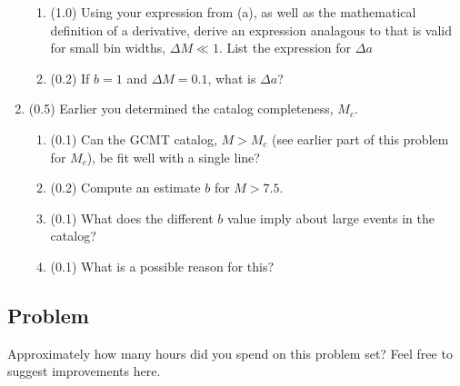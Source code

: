 \documentclass[11pt,titlepage,fleqn]{article}
\begin{document}
\begin{enumerate}
\begin{enumerate}

\item (1.0) Using your expression from (a), as well as the mathematical definition of a derivative, derive an expression analagous to  that is valid for small bin widths, $\Delta M \ll 1$. List the expression for $\Delta a$

\item (0.2) If $b = 1$ and $\Delta M = 0.1$, what is $\Delta a$?

\end{enumerate}


\item (0.5) Earlier you determined the catalog completeness, $M_c$.
%
\begin{enumerate}
\item (0.1) Can the GCMT catalog, $M > M_c$ (see earlier part of this problem for $M_c$), be fit well with a single line?
\item (0.2) Compute an estimate $b$ for $M > 7.5$.
\item (0.1) What does the different $b$ value imply about large events in the catalog?
\item (0.1) What is a possible reason for this?
\end{enumerate}

\end{enumerate}


\subsection*{Problem}

Approximately how many hours did you spend on this problem set? Feel free to suggest improvements here.

\pagebreak



\end{document}
